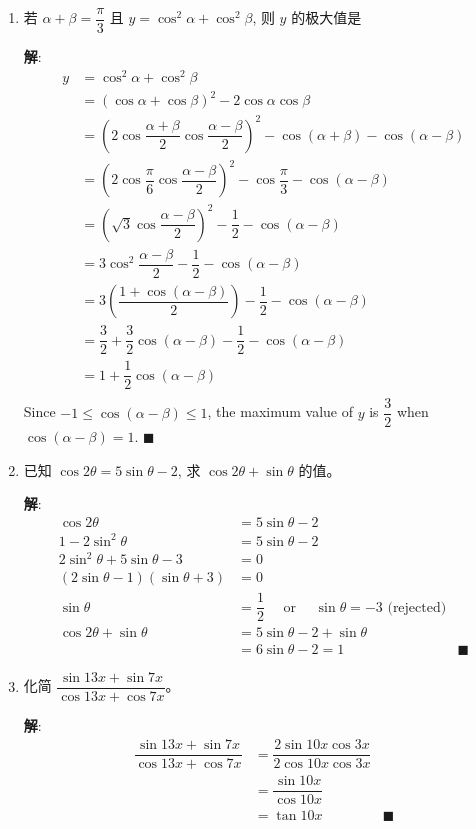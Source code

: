 \documentclass{report}
\newcommand{\sol}{\vspace{0.2cm}\textbf{解}:}
\begin{document}
\begin{enumerate}[leftmargin=*]
        \newpage
    \item 若 $\alpha+\beta=\dfrac{\pi}{3}$ 且 $y=\cos ^2 \alpha+\cos ^2 \beta$, 则 $y$ 的极大值是
    
    \sol{}
    \begin{align*}
        y &= \cos^2 \alpha + \cos^2 \beta \\
        &= \left(\cos \alpha + \cos \beta\right)^2 - 2\cos \alpha \cos \beta \\
        & = \left(2\cos \dfrac{\alpha + \beta}{2}\cos \dfrac{\alpha - \beta}{2}\right)^2 - \cos(\alpha + \beta) - \cos(\alpha - \beta) \\
        & = \left(2\cos \dfrac{\pi}{6}\cos \dfrac{\alpha - \beta}{2}\right)^2 - \cos\dfrac{\pi}{3} - \cos(\alpha - \beta) \\
        & = \left(\sqrt{3}\cos \dfrac{\alpha - \beta}{2}\right)^2 - \dfrac{1}{2} - \cos(\alpha - \beta) \\
        & = 3\cos^2 \dfrac{\alpha - \beta}{2} - \dfrac{1}{2} - \cos(\alpha - \beta) \\
        & = 3\left(\dfrac{1 + \cos(\alpha - \beta)}{2}\right) - \dfrac{1}{2} - \cos(\alpha - \beta) \\
        & = \dfrac{3}{2} + \dfrac{3}{2}\cos(\alpha - \beta) - \dfrac{1}{2} - \cos(\alpha - \beta) \\
        & = 1 + \dfrac{1}{2}\cos(\alpha - \beta) \\
    \end{align*}
    Since $-1 \leq \cos(\alpha - \beta) \leq 1$, the maximum value of $y$ is $\dfrac{3}{2}$ when $\cos(\alpha - \beta) = 1$. \hfill $\blacksquare$

    \item 已知 $\cos 2 \theta=5 \sin \theta-2$, 求 $\cos 2 \theta+\sin \theta$ 的值。
    
    \sol{}
    \begin{align*}
        \cos 2 \theta &= 5 \sin \theta - 2 \\
        1 - 2\sin^2 \theta &= 5\sin \theta - 2 \\
        2\sin^2 \theta + 5\sin \theta - 3 &= 0 \\
        (2\sin \theta - 1)(\sin \theta + 3) &= 0 \\
        \sin \theta &= \dfrac{1}{2} \quad \text{ or } \quad \sin \theta = -3 \text{ (rejected)} \\
        \cos 2 \theta + \sin \theta &= 5\sin \theta - 2 + \sin \theta \\
        & = 6\sin \theta - 2 = 1 &\blacksquare
    \end{align*}
    \item 化简 $\dfrac{\sin 13 x+\sin 7 x}{\cos 13 x+\cos 7 x}$。
    
    \sol{}
    \begin{align*}
        \dfrac{\sin 13 x+\sin 7 x}{\cos 13 x+\cos 7 x} &= \dfrac{2\sin 10 x \cos 3 x}{2\cos 10 x \cos 3 x} \\
        & = \dfrac{\sin 10 x}{\cos 10 x} \\
        & = \tan 10 x &\blacksquare
    \end{align*}
\end{enumerate}
\end{document}
